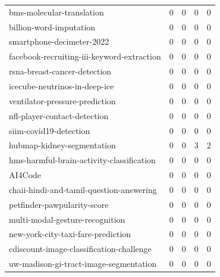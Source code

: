 {\begin{longtable}{p{6.2cm} c c c c}
bms-molecular-translation & 0 & 0 & 0 & 0 \\
billion-word-imputation & 0 & 0 & 0 & 0 \\
smartphone-decimeter-2022 & 0 & 0 & 0 & 0 \\
facebook-recruiting-iii-keyword-extraction & 0 & 0 & 0 & 0 \\
rsna-breast-cancer-detection & 0 & 0 & 0 & 0 \\
icecube-neutrinos-in-deep-ice & 0 & 0 & 0 & 0 \\
ventilator-pressure-prediction & 0 & 0 & 0 & 0 \\
nfl-player-contact-detection & 0 & 0 & 0 & 0 \\
siim-covid19-detection & 0 & 0 & 0 & 0 \\
hubmap-kidney-segmentation & 0 & 0 & 3 & 2 \\
hms-harmful-brain-activity-classification & 0 & 0 & 0 & 0 \\
AI4Code & 0 & 0 & 0 & 0 \\
chaii-hindi-and-tamil-question-answering & 0 & 0 & 0 & 0 \\
petfinder-pawpularity-score & 0 & 0 & 0 & 0 \\
multi-modal-gesture-recognition & 0 & 0 & 0 & 0 \\
new-york-city-taxi-fare-prediction & 0 & 0 & 0 & 0 \\
cdiscount-image-classification-challenge & 0 & 0 & 0 & 0 \\
uw-madison-gi-tract-image-segmentation & 0 & 0 & 0 & 0 \\
\end{longtable}
}



